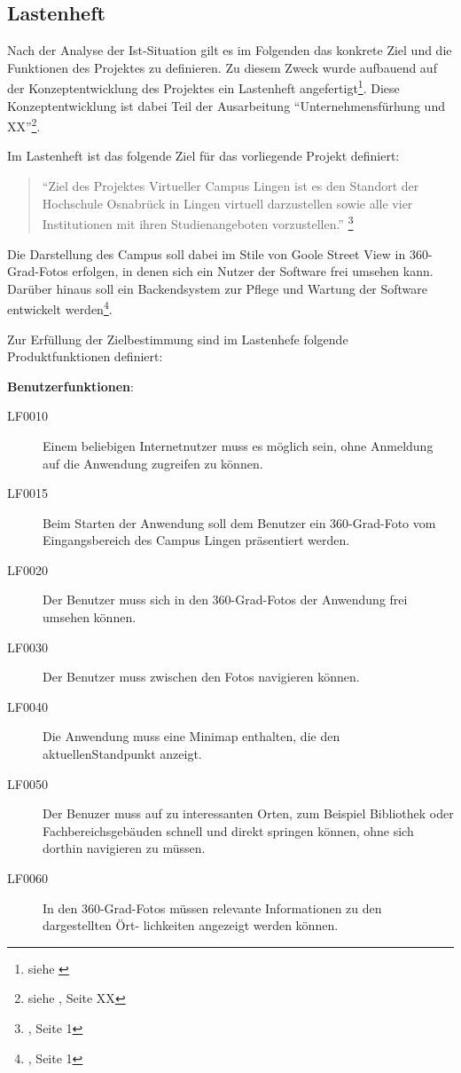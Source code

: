 \subsection{Lastenheft}
\label{sec:Lastenheft}

Nach der Analyse der Ist-Situation gilt es im Folgenden das konkrete Ziel und die Funktionen des Projektes zu definieren. 
Zu diesem Zweck wurde aufbauend auf der Konzeptentwicklung des Projektes ein Lastenheft angefertigt\footnote{siehe \citet{lastenheft2013}}.
Diese Konzeptentwicklung ist dabei Teil der Ausarbeitung "`Unternehmensfürhung und XX"'\footnote{siehe \citet{unternehmensfuehrung2014}, Seite XX}.

Im Lastenheft ist das folgende Ziel für das vorliegende Projekt definiert:

\begin{quote}
"`Ziel des Projektes Virtueller Campus Lingen ist es den Standort der Hochschule Osnabrück
in Lingen virtuell darzustellen sowie alle vier Institutionen mit ihren Studienangeboten
vorzustellen."' \footnote{\citet{lastenheft2013}, Seite 1}
\end{quote}

Die Darstellung des Campus soll dabei im Stile von Goole Street View in 360-Grad-Fotos erfolgen, in 
denen sich ein Nutzer der Software frei umsehen kann. Darüber hinaus soll ein Backendsystem zur Pflege und Wartung der 
Software entwickelt werden\footnote{\citet{lastenheft2013}, Seite 1}.

Zur Erfüllung der Zielbestimmung sind im Lastenhefe folgende Produktfunktionen definiert:

\textbf{Benutzerfunktionen}:

\begin{description}
  \item[LF0010] Einem beliebigen Internetnutzer muss es möglich sein, ohne Anmeldung auf die
  Anwendung zugreifen zu können.
  \item[LF0015] Beim Starten der Anwendung soll dem Benutzer ein 360-Grad-Foto vom
  Eingangsbereich des Campus Lingen präsentiert werden.
  \item[LF0020] Der Benutzer muss sich in den 360-Grad-Fotos der Anwendung frei umsehen
  können.
  \item[LF0030] Der Benutzer muss zwischen den Fotos navigieren können.
  \item[LF0040] Die Anwendung muss eine Minimap enthalten, die den aktuellenStandpunkt anzeigt.
  \item[LF0050] Der Benuzer muss auf zu interessanten Orten, zum Beispiel Bibliothek oder Fachbereichsgebäuden schnell und direkt springen können, ohne sich dorthin navigieren zu müssen.
  \item[LF0060] In den 360-Grad-Fotos müssen relevante Informationen zu den dargestellten Ört-
  lichkeiten angezeigt werden können.
\end{description}

